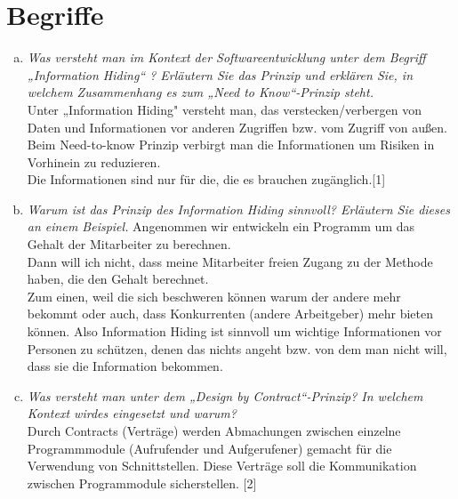 

\newcommand{\dozent}{Lutz Prechelt}
\newcommand{\tutor}{Samuel Domiks}
\newcommand{\tutoriumNo}{02\\Materialien: Latex, Skript}
\newcommand{\ubungNo}{09}
\newcommand{\veranstaltung}{Softwaretechnik}
\newcommand{\semester}{SoSe21}
\newcommand{\studenten}{Jonny Lam \& Thore Brehmer}




\section{Begriffe}
\begin{enumerate}[(a)]
    \item {\itshape Was versteht man im Kontext der Softwareentwicklung unter dem Begriff „Information Hiding“ ? Erläutern Sie das Prinzip und erklären Sie, in welchem Zusammenhang es zum „Need to Know“-Prinzip steht.} \\
    Unter „Information Hiding" versteht man, das verstecken/verbergen von Daten und Informationen vor anderen Zugriffen bzw. vom Zugriff von außen.\\
    Beim Need-to-know Prinzip verbirgt man die Informationen um Risiken in  Vorhinein zu reduzieren.\\ Die Informationen sind nur für die, die es brauchen zugänglich.[1]
    \item {\itshape Warum ist das Prinzip des Information Hiding sinnvoll? Erläutern Sie dieses an einem Beispiel.} 
    Angenommen wir entwickeln ein Programm um das Gehalt der Mitarbeiter zu berechnen.\\ Dann will ich nicht, dass meine Mitarbeiter freien Zugang zu der Methode haben, die den Gehalt berechnet.\\ Zum einen, weil die sich beschweren können warum der andere mehr bekommt oder auch, dass Konkurrenten (andere Arbeitgeber) mehr bieten können. Also Information Hiding ist sinnvoll um wichtige Informationen vor Personen zu schützen, denen das nichts angeht bzw. von dem man nicht will, dass sie die Information bekommen.
   

    \item {\itshape Was versteht man unter dem „Design by Contract“-Prinzip? In welchem Kontext wirdes eingesetzt und warum?} \\
    Durch Contracts (Verträge) werden Abmachungen zwischen einzelne Programmmodule (Aufrufender und Aufgerufener) gemacht für die Verwendung von Schnittstellen. Diese Verträge soll die Kommunikation zwischen Programmodule sicherstellen. [2]
   

\end{enumerate}
